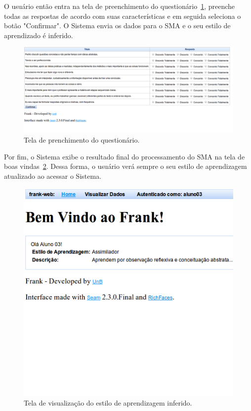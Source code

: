 O usuário então entra na tela de preenchimento do questionário~\ref{fig:frank-tela-aluno-preencher-questionario}, preenche todas as respostas de acordo com suas características e em seguida seleciona o botão "Confirmar". O Sistema envia os dados para o SMA e o seu estilo de aprendizado é inferido.

\begin{figure}
	\centering
	\includegraphics[scale=0.48]{images/frank-tela-aluno-preencher-questionario.png}
	\caption{Tela de prenchimento do questionário.}
	\label{fig:frank-tela-aluno-preencher-questionario}
\end{figure}

Por fim, o Sistema exibe o resultado final do processamento do SMA na tela de boas vindas~\ref{fig:frank-tela-aluno-inferencia-estilo}. Dessa forma, o usuário verá sempre o seu estilo de aprendizagem atualizado ao acessar o Sistema.

\begin{figure}
	\centering
	\includegraphics[scale=0.48]{images/frank-tela-aluno-inferencia-estilo.png}
	\caption{Tela de visualização do estilo de aprendizagem inferido.}
	\label{fig:frank-tela-aluno-inferencia-estilo}
\end{figure}

